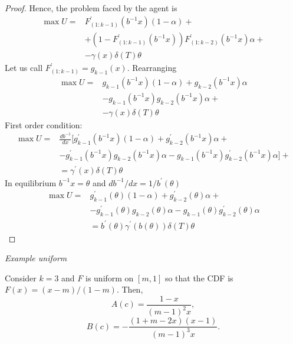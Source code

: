 \documentclass[11pt]{article}
\begin{document}
\begin{proof}
Hence, the problem faced by the agent is
\begin{equation}
\begin{split}
  \max  U = & F^\prime_{(1:k-1)}(b^{-1}{x}) (1-\alpha) + \\ 
        & + (1-F^\prime_{(1:k-1)}(b^{-1}{x})) F^\prime_{(1:k-2)}(b^{-1}{x}) \alpha + \\ 
        & - \gamma(x)\delta(T) \theta
\end{split}
\end{equation}
Let us call $F^\prime_{(1:k-1)} = g_{k-1}(x)$. Rearranging
\begin{equation}
\begin{split}
  \max  U = & g_{k-1}(b^{-1}{x}) (1-\alpha) + g_{k-2}(b^{-1}{x}) \alpha \\ 
        & - g_{k-1}(b^{-1}{x}) g_{k-2}(b^{-1}{x}) \alpha + \\ 
        & - \gamma(x)\delta(T) \theta
\end{split}
\end{equation}
First order condition: 
\begin{equation}
\begin{split}
  \max  U = & \frac{db^{-1}}{dx} [ g^\prime_{k-1}(b^{-1}{x}) (1-\alpha) +  g^\prime_{k-2}(b^{-1}{x}) \alpha + \\ 
  & - g^\prime_{k-1}(b^{-1}{x}) g_{k-2}(b^{-1}{x}) \alpha - g_{k-1}(b^{-1}{x})  g^\prime_{k-2}(b^{-1}{x}) \alpha ]+ \\ 
        & = \gamma^\prime(x)\delta(T) \theta
\end{split}
\end{equation}
In equilibrium $b^{-1}x = \theta$ and $d b^{-1}/ dx = 1/b^\prime(\theta)$
\begin{equation}
\begin{split}
  \max  U = & g^\prime_{k-1}(\theta) (1-\alpha) +  g^\prime_{k-2}(\theta) \alpha + \\ 
  & - g^\prime_{k-1}(\theta) g_{k-2}(\theta) \alpha - g_{k-1}(\theta)  g^\prime_{k-2}(\theta) \alpha  \\ 
        & = b^\prime(\theta) \gamma^\prime(b(\theta))\delta(T) \theta
\end{split}
\end{equation}
\end{proof}
 
\textit{Example uniform}

Consider $k=3$ and $F$ is uniform on $[m, 1]$ so that the CDF is $F(x)=(x-m) / (1-m)$.  Then, 
\begin{equation}
  A(c) = \frac{1-x}{(m-1)^2 x},
\end{equation}
\begin{equation}
  B(c) = -\frac{(1 + m - 2 x) (x-1)}{(m-1)^3 x}.
\end{equation}
\end{document}
